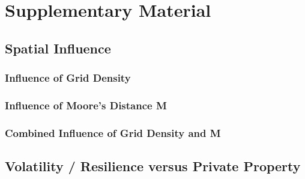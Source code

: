 \section*{Supplementary Material}

\subsection*{Spatial Influence}

\subsubsection*{Influence of Grid Density}

\subsubsection*{Influence of Moore's Distance M}

\subsubsection*{Combined Influence of Grid Density and M}

\subsection*{Volatility / Resilience versus Private Property}


